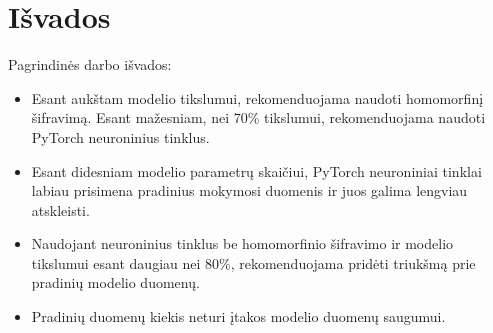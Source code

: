 \documentclass{VUMIFInfBakalaurinis}
\begin{document}
\section*{Išvados}

\par Pagrindinės darbo išvados:
\begin{itemize}
    \item  Esant aukštam modelio tikslumui, rekomenduojama naudoti homomorfinį šifravimą. Esant mažesniam, nei 70\% tikslumui, rekomenduojama naudoti PyTorch neuroninius tinklus.
    \item Esant didesniam modelio parametrų skaičiui, PyTorch neuroniniai tinklai labiau prisimena pradinius mokymosi duomenis ir juos galima lengviau atskleisti.
    \item Naudojant neuroninius tinklus be homomorfinio šifravimo ir modelio tikslumui esant daugiau nei 80\%, rekomenduojama pridėti triukšmą prie pradinių modelio duomenų.
    \item Pradinių duomenų kiekis neturi įtakos modelio duomenų saugumui.
\end{itemize}
\end{document}
